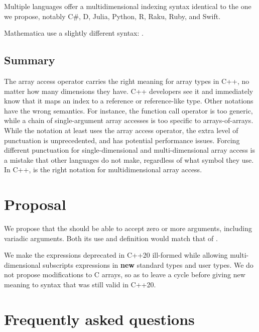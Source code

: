 \documentclass{wg21}
\begin{document}
Multiple languages offer a multidimensional indexing syntax identical to the one we propose, notably C\#, D, Julia, Python, R, Raku, Ruby, and Swift.

Mathematica use a slightly different syntax: .

\subsection{Summary}

The array access operator carries the right meaning for array types in C++, no matter how many dimensions they have.  C++ developers see it and immediately know that it maps an index to a reference or reference-like type.  Other notations have the wrong semantics.  For instance, the function call operator is too generic, while a chain of single-argument array accesses is too specific to arrays-of-arrays.  While the notation  at least uses the array access operator, the extra level of punctuation is unprecedented, and has potential performance issues.  Forcing different punctuation for single-dimensional and multi-dimensional array access is a mistake that other languages do not make, regardless of what symbol they use.  In C++,  is the right notation for multidimensional array access.



\section{Proposal}
We propose that the  should be able to accept zero or more arguments, including variadic arguments.
Both its use and definition would match that of .

We make the expressions deprecated in C++20 ill-formed while allowing multi-dimensional subscripts expressions in \textbf{new} standard types
and user types. We do not propose modifications to C arrays, so as to leave a cycle before giving new meaning to syntax that was still valid in C++20.

\section{Frequently asked questions}
\end{document}
